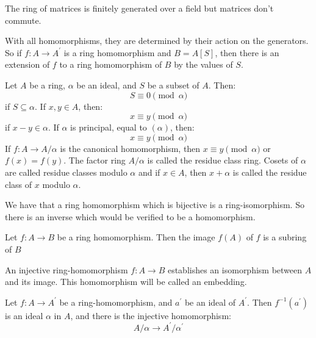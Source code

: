 \documentclass{report}
\begin{document}
\begin{examples}
    \begin{example}
        The ring of matrices is finitely generated over a field but matrices don't commute.
    \end{example} 
\end{examples}

With all homomorphisms, they are determined by their action on the generators. So if $f: A \rightarrow A^{\prime}$ is a ring homomorphism and $B = A[S]$, then there is an extension of $f$ to a ring homomorphism of $B$ by the values of $S$.

Let $A$ be a ring, $\alpha$ be an ideal, and $S$ be a subset of $A$. Then:
    \begin{equation*}
        S \equiv 0 \pmod{\alpha}
    \end{equation*}
if $S \subseteq \alpha$. If $x, y \in A$, then:
    \begin{equation*}
        x \equiv y \pmod{\alpha}
    \end{equation*}
if $x - y \in \alpha$. If $\alpha$ is principal, equal to $(\alpha)$, then:
    \begin{equation*}
        x \equiv y \pmod{\alpha}
    \end{equation*}
If $f: A \rightarrow A/\alpha$ is the canonical homomorphism, then $x \equiv y \pmod{\alpha}$ or $f(x) = f(y)$. The factor ring $A/\alpha$ is called the residue class ring. Cosets of $\alpha$ are called residue classes modulo $\alpha$ and if $x \in A$, then $x + \alpha$ is called the residue class of $x$ modulo $\alpha$.

We have that a ring homomorphism which is bijective is a ring-isomorphism. So there is an inverse which would be verified to be a homomorphism.
    
Let $f: A \rightarrow B$ be a ring homomorphism. Then the image $f(A)$ of $f$ is a subring of $B$

An injective ring-homomorphism $f: A \rightarrow B$ establishes an isomorphism between $A$
 and its image. This homomorphism will be called an embedding.

Let $f: A \rightarrow A^{\prime}$ be a ring-homomorphism, and $a^{\prime}$ be an ideal of $A^{\prime}$. Then $f^{-1}(a^{\prime})$ is an ideal $\alpha$ in $A$, and there is the injective homomorphism:
    \begin{equation*}
        A/\alpha \rightarrow A^{\prime}/\alpha^{\prime}
    \end{equation*}
\end{document}
